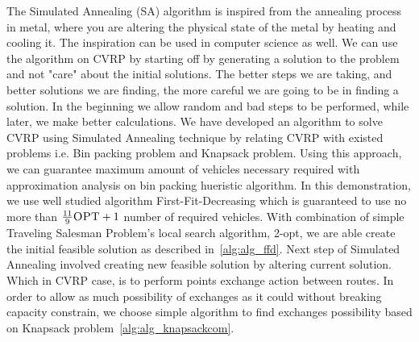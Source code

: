 \documentclass[12pt]{article}
\begin{document}
The Simulated Annealing (SA) algorithm is inspired from the annealing process in metal, where you are altering the physical state of the metal 
by heating and cooling it. The inspiration can be used in computer science as well. We can use the algorithm on CVRP by starting off by generating a solution 
to the problem and not "care" about the initial solutions. The better steps we are taking, and better solutions we are finding, the more careful we are going to be in finding 
a solution. In the beginning we allow random and bad steps to be performed, while later, we make better calculations.
\newline
We have developed an algorithm to solve CVRP using Simulated Annealing technique by relating CVRP with existed problems i.e. 
Bin packing problem and Knapsack problem. Using this approach, we can guarantee maximum amount of vehicles necessary required with approximation analysis on 
bin packing hueristic algorithm. In this demonstration, we use well studied 
algorithm First-Fit-Decreasing which is guaranteed to use no more than $\frac{11}{9}\textsc{OPT} + 1$ number of required vehicles\cite{FFD}. 
With combination of simple Traveling Salesman Problem's local search algorithm, 2-opt, we are able create the initial feasible solution as described 
in~\ref{alg:alg_ffd}. Next step of Simulated Annealing involved creating new feasible solution by altering current solution. 
Which in CVRP case, is to perform points exchange action between routes. In order to allow as much possibility of exchanges as it could without breaking 
capacity constrain, we choose simple algorithm to find exchanges possibility based on Knapsack problem~\ref{alg:alg_knapsackcom}.
\end{document}

